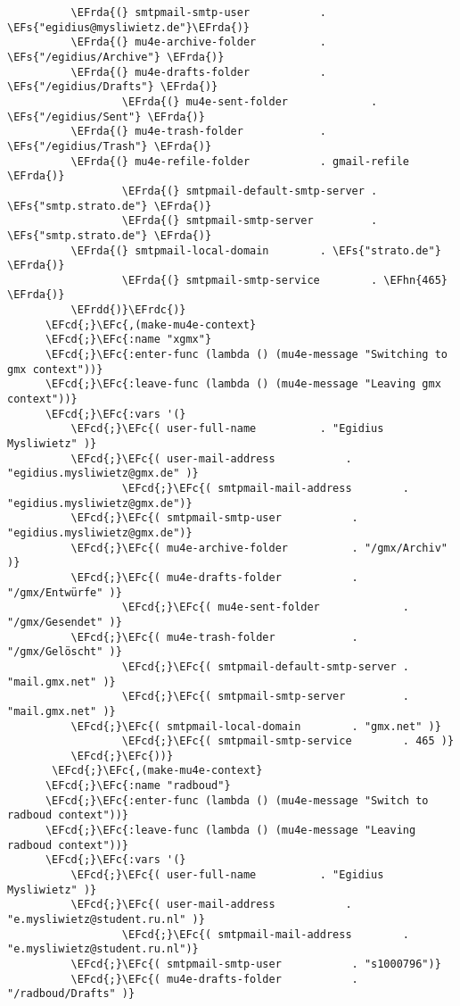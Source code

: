 \documentclass[a4wide,10pt]{article}
\newcommand{\EFc}[1]{\textcolor{EFc}{#1}} %
\newcommand{\EFcd}[1]{\textcolor{EFcd}{#1}} %
\newcommand{\EFs}[1]{\textcolor{EFs}{#1}} %
\newcommand{\EFhn}[1]{\textcolor{EFhn}{\textbf{#1}}} %
\newcommand{\EFrda}[1]{\textcolor{EFrda}{#1}} %
\newcommand{\EFrdc}[1]{\textcolor{EFrdc}{#1}} %
\newcommand{\EFrdd}[1]{\textcolor{EFrdd}{#1}} %
\begin{document}
\begin{Code}
\begin{Verbatim}
		  \EFrda{(} smtpmail-smtp-user           . \EFs{"egidius@mysliwietz.de"}\EFrda{)}
		  \EFrda{(} mu4e-archive-folder          . \EFs{"/egidius/Archive"} \EFrda{)}
		  \EFrda{(} mu4e-drafts-folder           . \EFs{"/egidius/Drafts"} \EFrda{)}
                  \EFrda{(} mu4e-sent-folder             . \EFs{"/egidius/Sent"} \EFrda{)}
		  \EFrda{(} mu4e-trash-folder            . \EFs{"/egidius/Trash"} \EFrda{)}
		  \EFrda{(} mu4e-refile-folder           . gmail-refile \EFrda{)}
                  \EFrda{(} smtpmail-default-smtp-server . \EFs{"smtp.strato.de"} \EFrda{)}
                  \EFrda{(} smtpmail-smtp-server         . \EFs{"smtp.strato.de"} \EFrda{)}
		  \EFrda{(} smtpmail-local-domain        . \EFs{"strato.de"} \EFrda{)}
                  \EFrda{(} smtpmail-smtp-service        . \EFhn{465} \EFrda{)}
		  \EFrdd{)}\EFrdc{)}
      \EFcd{;}\EFc{,(make-mu4e-context}
	  \EFcd{;}\EFc{:name "xgmx"}
	  \EFcd{;}\EFc{:enter-func (lambda () (mu4e-message "Switching to gmx context"))}
	  \EFcd{;}\EFc{:leave-func (lambda () (mu4e-message "Leaving gmx context"))}
	  \EFcd{;}\EFc{:vars '(}
		  \EFcd{;}\EFc{( user-full-name	         . "Egidius Mysliwietz" )}
		  \EFcd{;}\EFc{( user-mail-address	         . "egidius.mysliwietz@gmx.de" )}
                  \EFcd{;}\EFc{( smtpmail-mail-address        . "egidius.mysliwietz@gmx.de")}
		  \EFcd{;}\EFc{( smtpmail-smtp-user           . "egidius.mysliwietz@gmx.de")}
		  \EFcd{;}\EFc{( mu4e-archive-folder          . "/gmx/Archiv" )}
		  \EFcd{;}\EFc{( mu4e-drafts-folder           . "/gmx/Entwürfe" )}
                  \EFcd{;}\EFc{( mu4e-sent-folder             . "/gmx/Gesendet" )}
		  \EFcd{;}\EFc{( mu4e-trash-folder            . "/gmx/Gelöscht" )}
                  \EFcd{;}\EFc{( smtpmail-default-smtp-server . "mail.gmx.net" )}
                  \EFcd{;}\EFc{( smtpmail-smtp-server         . "mail.gmx.net" )}
		  \EFcd{;}\EFc{( smtpmail-local-domain        . "gmx.net" )}
                  \EFcd{;}\EFc{( smtpmail-smtp-service        . 465 )}
		  \EFcd{;}\EFc{))}
       \EFcd{;}\EFc{,(make-mu4e-context}
	  \EFcd{;}\EFc{:name "radboud"}
	  \EFcd{;}\EFc{:enter-func (lambda () (mu4e-message "Switch to radboud context"))}
	  \EFcd{;}\EFc{:leave-func (lambda () (mu4e-message "Leaving radboud context"))}
	  \EFcd{;}\EFc{:vars '(}
		  \EFcd{;}\EFc{( user-full-name	         . "Egidius Mysliwietz" )}
		  \EFcd{;}\EFc{( user-mail-address	         . "e.mysliwietz@student.ru.nl" )}
                  \EFcd{;}\EFc{( smtpmail-mail-address        . "e.mysliwietz@student.ru.nl")}
		  \EFcd{;}\EFc{( smtpmail-smtp-user           . "s1000796")}
		  \EFcd{;}\EFc{( mu4e-drafts-folder           . "/radboud/Drafts" )}

\end{Verbatim}
\end{Code}
\end{document}
